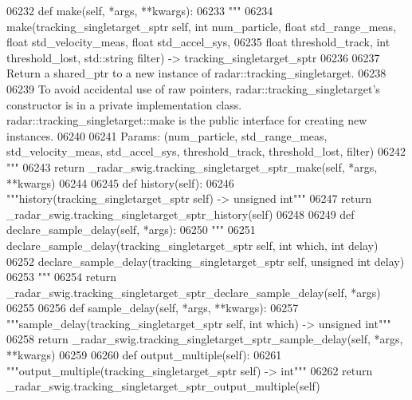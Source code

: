 \begin{DoxyCode}
{{{{{{{{{{{{{{{{{{{{{06232     \textcolor{keyword}{def }make(self, *args, **kwargs):
06233         \textcolor{stringliteral}{"""}
06234 \textcolor{stringliteral}{        make(tracking\_singletarget\_sptr self, int num\_particle, float std\_range\_meas, float
       std\_velocity\_meas, float std\_accel\_sys, }
06235 \textcolor{stringliteral}{            float threshold\_track, int threshold\_lost, std::string filter) -> tracking\_singletarget\_sptr}
06236 \textcolor{stringliteral}{}
06237 \textcolor{stringliteral}{        Return a shared\_ptr to a new instance of radar::tracking\_singletarget.}
06238 \textcolor{stringliteral}{}
06239 \textcolor{stringliteral}{        To avoid accidental use of raw pointers, radar::tracking\_singletarget's constructor is in a private
       implementation class. radar::tracking\_singletarget::make is the public interface for creating new
       instances.}
06240 \textcolor{stringliteral}{}
06241 \textcolor{stringliteral}{        Params: (num\_particle, std\_range\_meas, std\_velocity\_meas, std\_accel\_sys, threshold\_track,
       threshold\_lost, filter)}
06242 \textcolor{stringliteral}{        """}
06243         \textcolor{keywordflow}{return} \_radar\_swig.tracking\_singletarget\_sptr\_make(self, *args, **kwargs)
06244 
06245     \textcolor{keyword}{def }history(self):
06246         \textcolor{stringliteral}{"""history(tracking\_singletarget\_sptr self) -> unsigned int"""}
06247         \textcolor{keywordflow}{return} \_radar\_swig.tracking\_singletarget\_sptr\_history(self)
06248 
06249     \textcolor{keyword}{def }declare_sample_delay(self, *args):
06250         \textcolor{stringliteral}{"""}
06251 \textcolor{stringliteral}{        declare\_sample\_delay(tracking\_singletarget\_sptr self, int which, int delay)}
06252 \textcolor{stringliteral}{        declare\_sample\_delay(tracking\_singletarget\_sptr self, unsigned int delay)}
06253 \textcolor{stringliteral}{        """}
06254         \textcolor{keywordflow}{return} \_radar\_swig.tracking\_singletarget\_sptr\_declare\_sample\_delay(self, *args)
06255 
06256     \textcolor{keyword}{def }sample_delay(self, *args, **kwargs):
06257         \textcolor{stringliteral}{"""sample\_delay(tracking\_singletarget\_sptr self, int which) -> unsigned int"""}
06258         \textcolor{keywordflow}{return} \_radar\_swig.tracking\_singletarget\_sptr\_sample\_delay(self, *args, **kwargs)
06259 
06260     \textcolor{keyword}{def }output_multiple(self):
06261         \textcolor{stringliteral}{"""output\_multiple(tracking\_singletarget\_sptr self) -> int"""}
06262         \textcolor{keywordflow}{return} \_radar\_swig.tracking\_singletarget\_sptr\_output\_multiple(self)
}}}}}}}}}}}}}}}}}}}}}
\end{DoxyCode}
